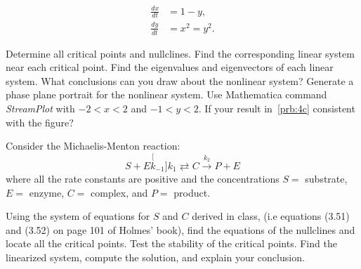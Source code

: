 \documentclass[
    number={7},
]{math486homework}
\begin{document}
\begin{problems}
\begin{equation*}
    \begin{aligned}
       \frac{dx}{dt} &= 1 - y,\\
       \frac{dy}{dt} &= x^{2} = y^{2}.
    \end{aligned}
    \end{equation*}
    \begin{problems}
       \subproblem Determine all critical points and nullclines. 
       \subproblem Find the corresponding linear system near each critical point. 
       \subproblem Find the eigenvalues and eigenvectors of each linear system.
       What conclusions can you draw about the nonlinear system? 
       \subproblem Generate a phase plane portrait for the nonlinear system.
       Use Mathematica command \textit{StreamPlot} with $-2 < x < 2$ and $-1 < y < 2$. 
       If your result in~\ref{prb:4c} consistent with the figure?
    \end{problems}
    \problem Consider the Michaelis-Menton reaction:
    \[ S + E \stackrel[k_{-1}]{k_{1}}{\rightleftarrows} C \stackrel{k_{2}}{\rightarrow} P + E \]
    where all the rate constants are positive and the concentrations $S = $ substrate, $E = $ enzyme, $C = $ complex, and $P = $ product.
    \begin{problems}
       \subproblem Using the system of equations for $S$ and $C$ derived in class, (i.e equations (3.51) and (3.52) on page 101 of Holmes' book), find the equations of the nullclines and locate all the critical points. 
       \subproblem Test the stability of the critical points.
       Find the linearized system, compute the solution, and explain your conclusion. 
    \end{problems}
\end{problems}
\end{document}
